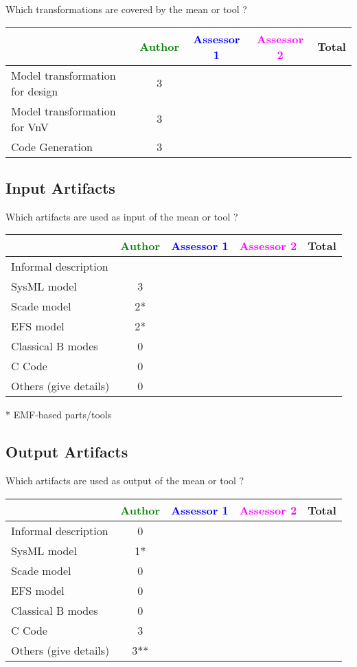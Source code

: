 Which transformations are covered by the mean or tool  ?

\begin{tabular}{|l | c | c | c | c|}
\hline
& \textcolor{green}{Author} & \textcolor{blue}{Assessor 1} & \textcolor{magenta}{Assessor 2} & Total \\
\hline 
Model transformation for design & 3& & &  \\
\hline
Model transformation for VnV  & 3& & & \\
\hline
Code Generation & 3& & & \\
\hline
\end{tabular}


\subsection{Input Artifacts}

Which artifacts are used as input of the mean or tool  ? 


\begin{tabular}{|l | c | c | c | c|}
\hline
& \textcolor{green}{Author} & \textcolor{blue}{Assessor 1} & \textcolor{magenta}{Assessor 2} & Total \\
\hline 
Informal description & & & &  \\
\hline
SysML model & 3& & & \\
\hline
Scade model & 2*& & & \\
\hline
EFS model & 2*& & & \\
\hline
Classical B modes & 0& & &  \\
\hline
C Code & 0& & & \\
\hline
Others (give details) & 0& & & \\
\hline
\end{tabular}

\begin{author_comment}
* EMF-based parts/tools
\end{author_comment}

\subsection{Output Artifacts}

Which artifacts are used as output of the mean or tool  ? 


\begin{tabular}{|l | c | c | c | c|}
\hline
& \textcolor{green}{Author} & \textcolor{blue}{Assessor 1} & \textcolor{magenta}{Assessor 2} & Total \\
\hline 
Informal description & 0& & &  \\
\hline
SysML model & 1*& & & \\
\hline
Scade model & 0& & & \\
\hline
EFS model & 0& & & \\
\hline
Classical B modes & 0& & &  \\
\hline
C Code & 3& & & \\
\hline
Others (give details) & 3**& & & \\
\hline
\end{tabular}


